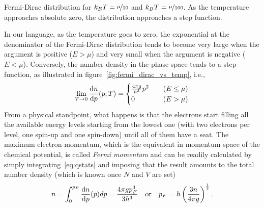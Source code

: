 \begin{marginfigure}
  
  \caption{Fermi-Dirac distribution for $k_B T = \nicefrac{\mu}{10}$ and
    $k_B T = \nicefrac{\mu}{100}$. As the temperature approaches absolute zero,
    the distribution approaches a step function.}
  \label{fig:fermi_dirac_vs_temp}
\end{marginfigure}

In our language, as the temperature goes to zero, the exponential at the denominator
of the Fermi-Dirac distribution tends to become very large when the argument is
positive ($E > \mu$) and very small when the argument is negative ($E < \mu$).
Conversely, the number density in the phase space tends to a step function, as
illustrated in figure~\ref{fig:fermi_dirac_vs_temp}, i.e.,
\begin{align*}
  \lim_{T \rightarrow 0} \dv{n}{p}{(p; T)} =
  \begin{cases}
    \frac{4\pi g}{h^3} p^2 \quad & (E \leq \mu)\\
    0 \quad & (E > \mu)
  \end{cases}
\end{align*}
From a physical standpoint, what happens is that the electrons start filling all
the available energy levels starting from the lowest one (with two electrons per
level, one spin-up and one spin-down) until all of them have a seat. The maximum
electron momentum, which is the equivalent in momentum space of the chemical
potential, is called \emph{Fermi momentum} and can be readily calculated by simply
integrating~\eqref{eq:qstats} and imposing that the result amounts to the total
number density (which is known once $N$ and $V$ are set)
\begin{align}\label{eq:fermi_momentum}
  n = \int_0^{p_F} \dv{n}{p}{(p)}dp = \frac{4\pi g p_F^3}{3h^3}
  \quad \text{or} \quad
  p_F = h \left( \frac{3n}{4\pi g} \right)^\frac{1}{3}.
\end{align}

